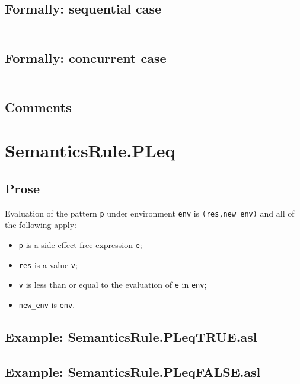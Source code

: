 \documentclass{book}
\begin{document}
  \subsection{Formally: sequential case}
  \begin{align}
  \end{align} 

  \subsection{Formally: concurrent case}
  \begin{align}
  \end{align} 

  \subsection{Comments}

\section{SemanticsRule.PLeq \label{sec:SemanticsRule.PLeq}}

    \subsection{Prose}
   Evaluation of the pattern \texttt{p} under environment \texttt{env} is
  \texttt{(res,new\_env)} and all of the following apply:
    \begin{itemize}
    \item \texttt{p} is a side-effect-free expression \texttt{e};
    \item \texttt{res} is a value \texttt{v};
    \item \texttt{v} is less than or equal to the evaluation of \texttt{e} in \texttt{env};
    \item \texttt{new\_env} is \texttt{env}.
    \end{itemize}

    \subsection{Example: SemanticsRule.PLeqTRUE.asl}

    \subsection{Example: SemanticsRule.PLeqFALSE.asl}
\end{document}
